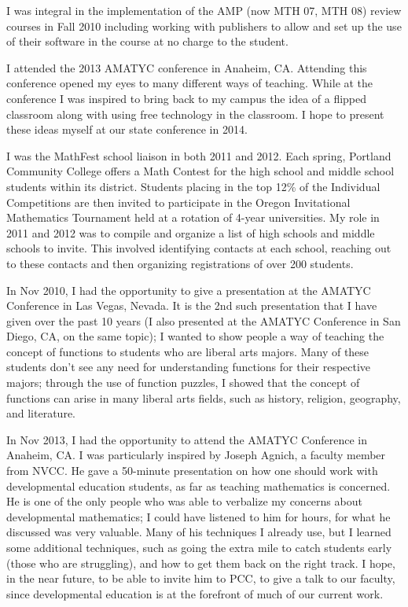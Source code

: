 \begin{description}[style=nextline]
	I was integral in the implementation of the AMP (now MTH 07, MTH 08) review
	courses in Fall 2010 including working with publishers to allow and set up the
	use of their software in the course at no charge to the student.

	\item[Wendy Fresh (Full-time Instructor, Rock Creek Campus)]
	I attended the 2013 AMATYC conference in Anaheim, CA.  Attending this
	conference opened my eyes to many different ways of teaching.  While at the
	conference I was inspired to bring back to my campus the idea of a
	flipped classroom along with using free technology in the classroom.  I
	hope to present these ideas myself at our state conference in 2014.

	I was the MathFest school liaison in both 2011 and 2012.  Each spring, Portland
	Community College offers a Math Contest for the high school and middle school
	students within its district.  Students placing in the top 12\% of the
	Individual Competitions are then invited to participate in the Oregon
	Invitational Mathematics Tournament held at a rotation of 4-year universities.
	My role in 2011 and 2012 was to compile and organize a list of high schools and
	middle schools to invite.  This involved identifying contacts at each school,
	reaching out to these contacts and then organizing registrations of over 200
	students.

	\item[Matthew Funk (Faculty Chair, Southeast Campus)]
	In Nov 2010, I had the opportunity to give a presentation at the AMATYC
	Conference in Las Vegas, Nevada.  It is the 2nd such presentation that I have
	given over the past 10 years (I also presented at the AMATYC Conference in San
	Diego, CA, on the same topic); I wanted to show people a way of teaching the
	concept of functions to students who are liberal arts majors.  Many of these
	students don't see any need for understanding functions for their respective
	majors; through the use of function puzzles, I showed that the concept of
	functions can arise in many liberal arts fields, such as history, religion,
	geography, and literature.

	In Nov 2013, I had the opportunity to attend the AMATYC Conference in Anaheim,
	CA.  I was particularly inspired by Joseph Agnich, a faculty member from NVCC.
	He gave a 50-minute presentation on how one should work with developmental
	education students, as far as teaching mathematics is concerned.  He is one of
	the only people who was able to verbalize my concerns about developmental
	mathematics; I could have listened to him for hours, for what he discussed was
	very valuable.  Many of his techniques I already use, but I learned some
	additional techniques, such as going the extra mile to catch students early
	(those who are struggling), and how to get them back on the right track.  I
	hope, in the near future, to be able to invite him to PCC, to give a talk to
	our faculty, since developmental education is at the forefront of much of our
	current work.


\end{description}
